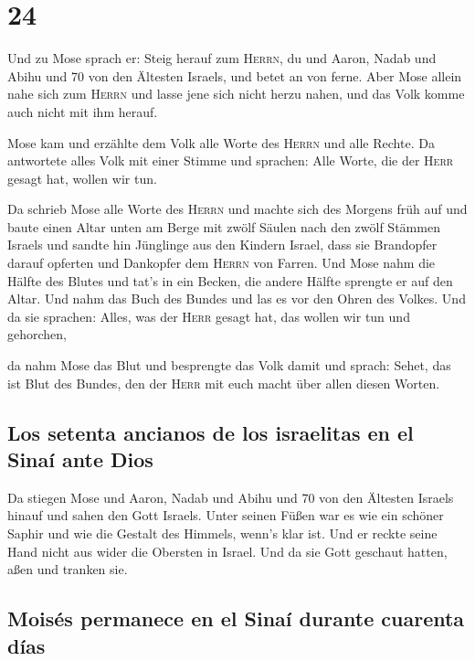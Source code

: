 \hypertarget{section-23}{%
\section{24}\label{section-23}}

 Und zu Mose sprach er: Steig herauf zum \textsc{Herrn},
du und Aaron, Nadab und Abihu und 70 von den Ältesten Israels, und betet
an von ferne.  Aber Mose allein nahe sich zum
\textsc{Herrn} und lasse jene sich nicht herzu nahen, und das Volk komme
auch nicht mit ihm herauf.

 Mose kam und erzählte dem Volk alle Worte des
\textsc{Herrn} und alle Rechte. Da antwortete alles Volk mit einer
Stimme und sprachen: Alle Worte, die der \textsc{Herr} gesagt hat,
wollen wir tun.

 Da schrieb Mose alle Worte des \textsc{Herrn} und machte
sich des Morgens früh auf und baute einen Altar unten am Berge mit zwölf
Säulen nach den zwölf Stämmen Israels  und sandte hin
Jünglinge aus den Kindern Israel, dass sie Brandopfer darauf opferten
und Dankopfer dem \textsc{Herrn} von Farren.  Und Mose
nahm die Hälfte des Blutes und tat's in ein Becken, die andere Hälfte
sprengte er auf den Altar.  Und nahm das Buch des Bundes
und las es vor den Ohren des Volkes. Und da sie sprachen: Alles, was der
\textsc{Herr} gesagt hat, das wollen wir tun und gehorchen,

 da nahm Mose das Blut und besprengte das Volk damit und
sprach: Sehet, das ist Blut des Bundes, den der \textsc{Herr} mit euch
macht über allen diesen Worten.

\hypertarget{los-setenta-ancianos-de-los-israelitas-en-el-sinauxed-ante-dios}{%
\subsection{Los setenta ancianos de los israelitas en el Sinaí ante
Dios}\label{los-setenta-ancianos-de-los-israelitas-en-el-sinauxed-ante-dios}}

 Da stiegen Mose und Aaron, Nadab und Abihu und 70 von den
Ältesten Israels hinauf  und sahen den Gott Israels.
Unter seinen Füßen war es wie ein schöner Saphir und wie die Gestalt des
Himmels, wenn's klar ist.  Und er reckte seine Hand nicht
aus wider die Obersten in Israel. Und da sie Gott geschaut hatten, aßen
und tranken sie.

\hypertarget{moisuxe9s-permanece-en-el-sinauxed-durante-cuarenta-duxedas}{%
\subsection{Moisés permanece en el Sinaí durante cuarenta
días}\label{moisuxe9s-permanece-en-el-sinauxed-durante-cuarenta-duxedas}}


